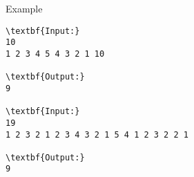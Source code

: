 Example
\begin{verbatim}
\textbf{Input:}
10
1 2 3 4 5 4 3 2 1 10

\textbf{Output:}
9

\textbf{Input:}
19
1 2 3 2 1 2 3 4 3 2 1 5 4 1 2 3 2 2 1

\textbf{Output:}
9\end{verbatim}